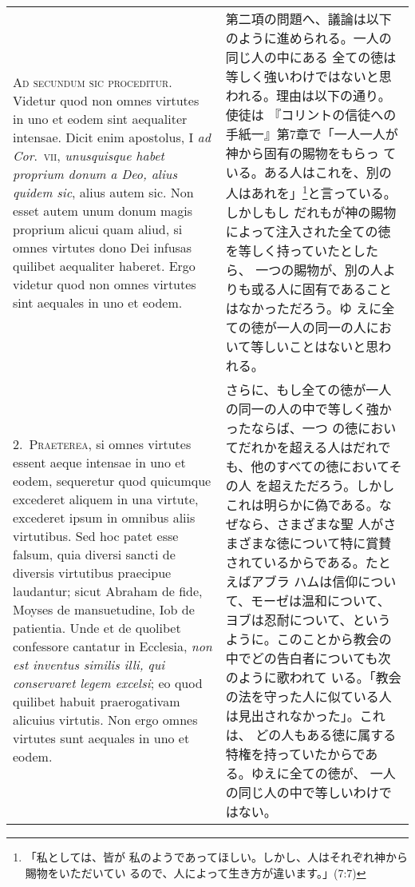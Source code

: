 \documentclass[10pt]{jsarticle}
\begin{document}
\begin{longtable}{p{21em}p{21em}}

{\scshape Ad secundum sic proceditur}. Videtur quod non omnes virtutes
in uno et eodem sint aequaliter intensae. Dicit enim apostolus, I
{\itshape ad Cor}.~{\scshape vii}, {\itshape unusquisque habet
proprium donum a Deo, alius quidem sic}, alius autem sic. Non esset
autem unum donum magis proprium alicui quam aliud, si omnes virtutes
dono Dei infusas quilibet aequaliter haberet. Ergo videtur quod non
omnes virtutes sint aequales in uno et eodem.


&

 第二項の問題へ、議論は以下のように進められる。一人の同じ人の中にある
 全ての徳は等しく強いわけではないと思われる。理由は以下の通り。使徒は
 『コリントの信徒への手紙一』第7章で「一人一人が神から固有の賜物をもらっ
 ている。ある人はこれを、別の人はあれを」\footnote{「私としては、皆が
 私のようであってほしい。しかし、人はそれぞれ神から賜物をいただいてい
 るので、人によって生き方が違います。」(7:7)}と言っている。しかしもし
 だれもが神の賜物によって注入された全ての徳を等しく持っていたとしたら、
 一つの賜物が、別の人よりも或る人に固有であることはなかっただろう。ゆ
 えに全ての徳が一人の同一の人において等しいことはないと思われる。

\\



2.~{\scshape Praeterea}, si omnes virtutes essent aeque intensae in
uno et eodem, sequeretur quod quicumque excederet aliquem in una
virtute, excederet ipsum in omnibus aliis virtutibus. Sed hoc patet
esse falsum, quia diversi sancti de diversis virtutibus praecipue
laudantur; sicut Abraham de fide, Moyses de mansuetudine, Iob de
patientia. Unde et de quolibet confessore cantatur in Ecclesia,
{\itshape non est inventus similis illi, qui conservaret legem
excelsi}; eo quod quilibet habuit praerogativam alicuius virtutis. Non
ergo omnes virtutes sunt aequales in uno et eodem.


&

 さらに、もし全ての徳が一人の同一の人の中で等しく強かったならば、一つ
 の徳においてだれかを超える人はだれでも、他のすべての徳においてその人
 を超えただろう。しかしこれは明らかに偽である。なぜなら、さまざまな聖
 人がさまざまな徳について特に賞賛されているからである。たとえばアブラ
 ハムは信仰について、モーゼは温和について、ヨブは忍耐について、という
 ように。このことから教会の中でどの告白者についても次のように歌われて
 いる。「教会の法を守った人に似ている人は見出されなかった」。これは、
 どの人もある徳に属する特権を持っていたからである。ゆえに全ての徳が、
 一人の同じ人の中で等しいわけではない。


\end{longtable}
\end{document}

